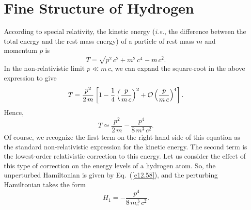 \section{Fine Structure of Hydrogen}\label{s12.8}
According to special relativity, the kinetic energy ({\em i.e.}, the difference
between the total energy and the rest mass energy) of a particle
of rest mass $m$ and momentum $p$ is
\begin{equation}
T = \sqrt{p^2\,c^2+m^2\,c^4} - m\,c^2.
\end{equation}
In the non-relativistic limit $p\ll m\,c$, we can expand the square-root
in the above expression to give
\begin{equation}
T = \frac{p^2}{2\,m}\left[1- \frac{1}{4}\left(\frac{p}{m\,c}\right)^2+ 
{\cal O}\left(\frac{p}{m\,c}\right)^4\right].
\end{equation}
Hence,
\begin{equation}
T \simeq \frac{p^2}{2\,m} - \frac{p^4}{8\,m^3\,c^2}.
\end{equation}
Of course, we recognize the first term on the right-hand side of this equation
as the standard non-relativistic expression for the kinetic energy.
The second term is the lowest-order relativistic correction to this
energy. Let us consider the effect of this type of correction on the energy
levels of a hydrogen atom. So, the unperturbed Hamiltonian is
given by Eq.~(\ref{e12.58}), and the perturbing Hamiltonian
takes the form
\begin{equation}
H_1 = - \frac{p^4}{8\,m_e^{\,3}\,c^2}.
\end{equation}

